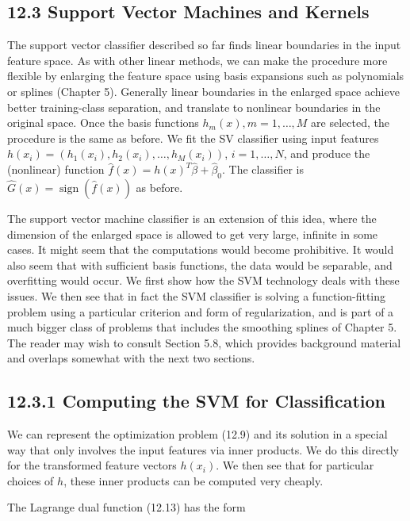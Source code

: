 \documentclass[10pt]{article}
\begin{document}
\subsection*{12.3 Support Vector Machines and Kernels}
The support vector classifier described so far finds linear boundaries in the input feature space. As with other linear methods, we can make the procedure more flexible by enlarging the feature space using basis expansions such as polynomials or splines (Chapter 5). Generally linear boundaries in the enlarged space achieve better training-class separation, and translate to nonlinear boundaries in the original space. Once the basis functions $h_{m}(x), m=1, \ldots, M$ are selected, the procedure is the same as before. We fit the SV classifier using input features $h\left(x_{i}\right)=\left(h_{1}\left(x_{i}\right), h_{2}\left(x_{i}\right), \ldots, h_{M}\left(x_{i}\right)\right)$, $i=1, \ldots, N$, and produce the (nonlinear) function $\hat{f}(x)=h(x)^{T} \hat{\beta}+\hat{\beta}_{0}$. The classifier is $\hat{G}(x)=\operatorname{sign}(\hat{f}(x))$ as before.

The support vector machine classifier is an extension of this idea, where the dimension of the enlarged space is allowed to get very large, infinite in some cases. It might seem that the computations would become prohibitive. It would also seem that with sufficient basis functions, the data would be separable, and overfitting would occur. We first show how the SVM technology deals with these issues. We then see that in fact the SVM classifier is solving a function-fitting problem using a particular criterion and form of regularization, and is part of a much bigger class of problems that includes the smoothing splines of Chapter 5. The reader may wish to consult Section 5.8, which provides background material and overlaps somewhat with the next two sections.

\subsection*{12.3.1 Computing the SVM for Classification}
We can represent the optimization problem (12.9) and its solution in a special way that only involves the input features via inner products. We do this directly for the transformed feature vectors $h\left(x_{i}\right)$. We then see that for particular choices of $h$, these inner products can be computed very cheaply.

The Lagrange dual function (12.13) has the form
\end{document}
